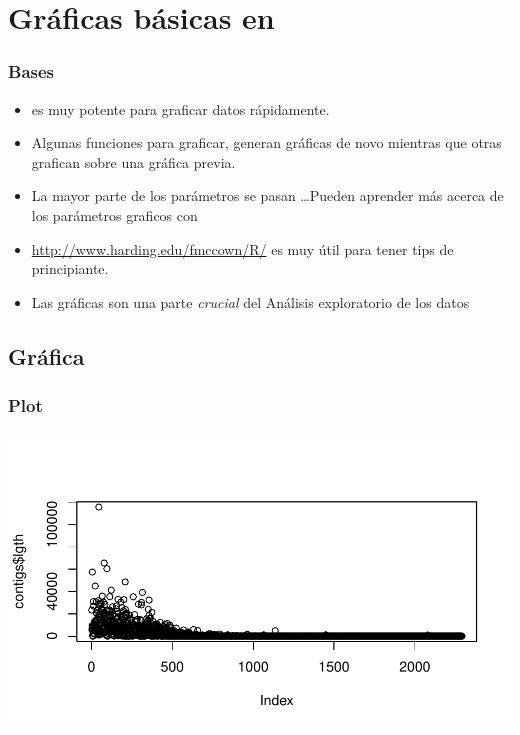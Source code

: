 \section{Gr\'aficas b\'asicas en }

\begin{frame}[allowframebreaks]
  \frametitle{Bases}
  \begin{itemize}
  \item {} es muy potente para graficar datos r\'apidamente.
  \item Algunas funciones para graficar, generan gr\'aficas de novo mientras que otras grafican sobre una gr\'afica previa.
  \item La mayor parte de los par\'ametros se pasan \ldots Pueden aprender m\'as acerca de los par\'ametros graficos con 
  \item \url{http://www.harding.edu/fmccown/R/} es muy \'util para tener tips de principiante.
  \item Las gr\'aficas son una parte \emph{crucial} del \alert{An\'alisis exploratorio de los datos}
  \end{itemize}
\end{frame}

\subsection{Gráfica}

\begin{frame}
  \frametitle{Plot}
\begin{Schunk}
\end{Schunk}
\includegraphics{plots/figura-024}
\end{frame}

